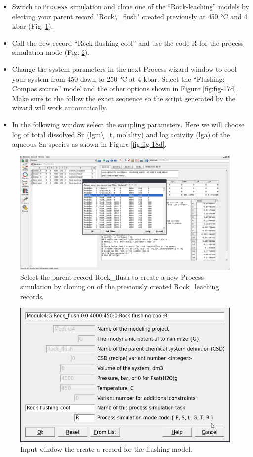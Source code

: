 \documentclass[
]{book}
\begin{document}
\begin{itemize}
\item
  Switch to \texttt{Process} simulation and clone one of the ``Rock-leaching'' models by electing your parent record "Rock\textbackslash\_flush" created previously at 450 °C and 4 kbar (Fig. \ref{fig:fig-15d}).
\item
  Call the new record ``Rock-flushing-cool'' and use the code R for the process simulation mode (Fig. \ref{fig:fig-16d}).
\item
  Change the system parameters in the next Process wizard window to cool your system from 450 down to 250 °C at 4 kbar. Select the ``Flushing: Compos source'' model and the other options shown in Figure \ref{fig:fig-17d}. Make sure to the follow the exact sequence so the script generated by the wizard will work automatically.
\item
  In the following window select the sampling parameters. Here we will choose log of total dissolved Sn (lgm\textbackslash\_t, molality) and log activity (lga) of the aqueous Sn species as shown in Figure \ref{fig:fig-18d}.
\end{itemize}

\begin{figure}
\includegraphics[width=1\linewidth]{figures/module4/fig-15} \caption{Select the parent record Rock\_flush to create a new Process simulation by cloning on of the previously created Rock\_leaching records.}\label{fig:fig-15d}
\end{figure}

\begin{figure}
\includegraphics[width=0.7\linewidth]{figures/module4/fig-16} \caption{Input window the create a record for the flushing model.}\label{fig:fig-16d}
\end{figure}
\end{document}

